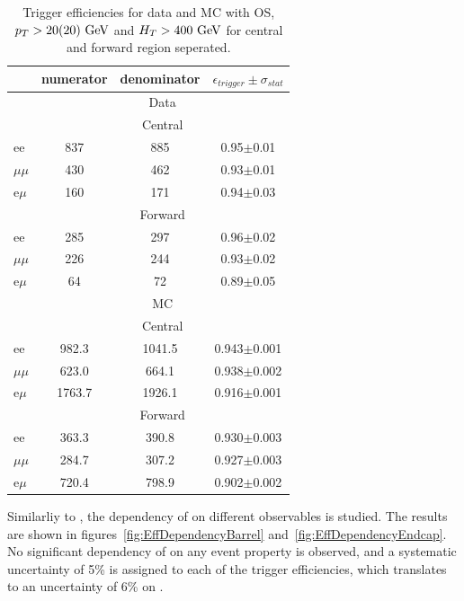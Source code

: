 \begin{table}[hbp]
  \begin{center}
  \caption{
    Trigger efficiencies for data and MC with OS, $p_T>20(20)\,\,\text{Ge\hspace{-.08em}V}$
    and $H_T>400\,\,\text{Ge\hspace{-.08em}V}$ for central and forward region seperated.
  } 
  \begin{tabular}{l|c|c|c}     
    & numerator & denominator & $\epsilon_{trigger} \pm \sigma_{stat}$  \\ 
    \hline
    &\multicolumn{3}{c}{Data} \\
    \hline
    &  \multicolumn{3}{|c}{ Central } \\
    \hline
    ee       & 837 & 885 & 0.95$\pm$0.01  \\
    $\mu\mu$ & 430 & 462 & 0.93$\pm$0.01  \\
    e$\mu$   & 160 & 171 & 0.94$\pm$0.03  \\        
    \hline 
    &  \multicolumn{3}{|c}{ Forward } \\
    \hline
    ee       & 285 & 297 & 0.96$\pm$0.02  \\
    $\mu\mu$ & 226 & 244 & 0.93$\pm$0.02  \\
    e$\mu$   &  64 &  72 & 0.89$\pm$0.05  \\
    \hline
    \hline
    & \multicolumn{3}{c}{MC} \\
    \hline
    & \multicolumn{3}{|c}{ Central } \\
    \hline 
    ee       &  982.3 & 1041.5 & 0.943$\pm$0.001 \\
    $\mu\mu$ &  623.0 &  664.1 & 0.938$\pm$0.002 \\
    e$\mu$   & 1763.7 & 1926.1 & 0.916$\pm$0.001 \\    
    \hline 
    & \multicolumn{3}{|c}{ Forward } \\
    \hline 
    ee       &  363.3 & 390.8 & 0.930$\pm$0.003 \\
    $\mu\mu$ &  284.7 & 307.2 & 0.927$\pm$0.003 \\
    e$\mu$   &  720.4 & 798.9 & 0.902$\pm$0.002 \\    
    \hline 
    \hline
  \end{tabular}  
  \label{tab:EffValues_Seperated}
  \end{center}
\end{table}	

Similarliy to \rmue, the dependency of \rt on different observables is studied.
The results are shown in figures~\ref{fig:EffDependencyBarrel} and~\ref{fig:EffDependencyEndcap}.
No significant dependency of \rt on any event property is observed,
and a systematic uncertainty of 5\% is assigned to each of the trigger efficiencies,
which translates to an uncertainty of 6\% on \rt.


